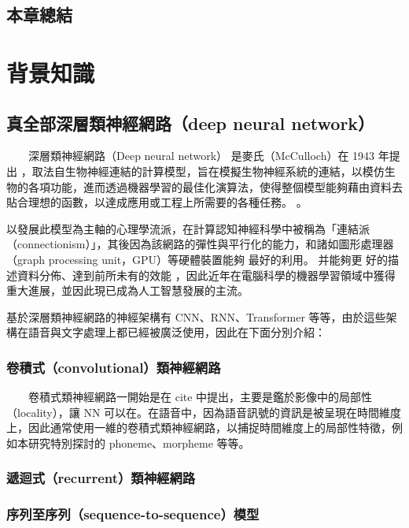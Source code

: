 \section{本章總結}

\chapter{背景知識}
\section{真全部深層類神經網路（deep neural network）}

　　深層類神經網路（Deep neural network） 是麥氏（McCulloch）在 1943 年提出 \cite{mcculloch1943logical}，取法自生物神經連結的計算模型，旨在模擬生物神經系統的連結，以模仿生物的各項功能，進而透過機器學習的最佳化演算法，使得整個模型能夠藉由資料去貼合理想的函數，以達成應用或工程上所需要的各種任務。 。

    以發展此模型為主軸的心理學流派，在計算認知神經科學中被稱為「連結派（connectionism）」，其後因為該網路的彈性與平行化的能力，和諸如圖形處理器（graph processing unit，GPU）等硬體裝置能夠 最好的利用。 
    并能夠更 好的描述資料分佈、達到前所未有的效能 ，因此近年在電腦科學的機器學習領域中獲得重大進展，並因此現已成為人工智慧發展的主流。

    基於深層類神經網路的神經架構有 CNN、RNN、Transformer 等等，由於這些架構在語音與文字處理上都已經被廣泛使用，因此在下面分別介紹：

\subsection{卷積式（convolutional）類神經網路}

　　卷積式類神經網路一開始是在 cite 中提出，主要是鑑於影像中的局部性（locality），讓 NN 可以在。在語音中，因為語音訊號的資訊是被呈現在時間維度上，因此通常使用一維的卷積式類神經網路，以捕捉時間維度上的局部性特徵，例如本研究特別探討的 phoneme、morpheme 等等。

\subsection{遞迴式（recurrent）類神經網路}

\subsection{
    序列至序列（sequence-to-sequence）模型}
    
